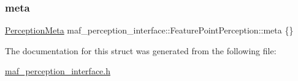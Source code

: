 \subsubsection{\texorpdfstring{meta}{meta}}
{\footnotesize\ttfamily \hyperlink{structmaf__perception__interface_1_1PerceptionMeta}{Perception\+Meta} maf\+\_\+perception\+\_\+interface\+::\+Feature\+Point\+Perception\+::meta \{\}}



The documentation for this struct was generated from the following file\+:\begin{DoxyCompactItemize}
\item 
\hyperlink{maf__perception__interface_8h}{maf\+\_\+perception\+\_\+interface.\+h}\end{DoxyCompactItemize}
